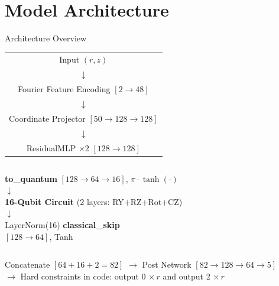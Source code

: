 \documentclass[aspectratio=169]{beamer}
\begin{document}
\section{Model Architecture}

\begin{frame}{Architecture Overview}
\begin{center}
\small
\begin{tabular}{c}
Input $(r, z)$ \\
$\downarrow$ \\
Fourier Feature Encoding $[2 \to 48]$ \\
$\downarrow$ \\
Coordinate Projector $[50 \to 128 \to 128]$ \\
$\downarrow$ \\
ResidualMLP $\times 2$ $[128 \to 128]$ \\
\end{tabular}
\end{center}

\vspace{0.1cm}
\begin{columns}
\centering
\textbf{to\_quantum} $[128\to64\to16]$, $\pi\cdot\tanh(\cdot)$ \\
$\downarrow$ \\
\textbf{16-Qubit Circuit} (2 layers: RY+RZ+Rot+CZ) \\
$\downarrow$ \\
LayerNorm(16)
\centering
\textbf{classical\_skip} \\
$[128 \to 64]$, Tanh
\end{columns}

\vspace{0.1cm}
\begin{center}
Concatenate $[64+16+2=82]$ $\to$ Post Network $[82\to128\to64\to5]$ \\
$\to$ Hard constraints in code: output 0 $\times\, r$ and output 2 $\times\, r$
\end{center}
\end{frame}
\end{document}
